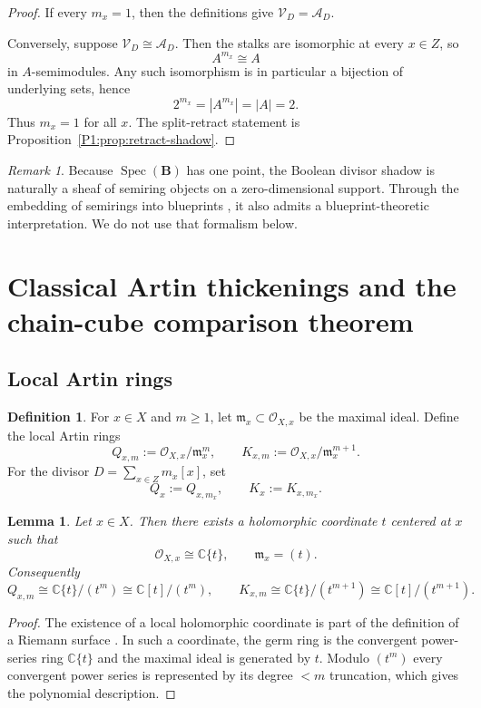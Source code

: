 \documentclass[11pt,a4paper]{article}
\numberwithin{equation}{section}
\newtheorem{lemma}[theorem]{Lemma}
\theoremstyle{definition}
\newtheorem{definition}[theorem]{Definition}
\theoremstyle{remark}
\newtheorem{remark}[theorem]{Remark}
\DeclareMathOperator{\Spec}{Spec}
\newcommand{\CC}{\mathbb C}
\newcommand{\BB}{\mathbf B}
\newcommand{\cO}{\mathcal O}
\newcommand{\cV}{\mathcal V}
\newcommand{\cA}{\mathcal A}
\begin{document}
\begin{proof}
If every $m_x=1$, then the definitions give $\cV_D=\cA_D$.

Conversely, suppose $\cV_D\cong\cA_D$.  Then the stalks are isomorphic at every $x\in Z$, so
\[
A^{m_x}\cong A
\]
in $A$-semimodules.  Any such isomorphism is in particular a bijection of underlying sets, hence
\[
2^{m_x}=|A^{m_x}|=|A|=2.
\]
Thus $m_x=1$ for all $x$.  The split-retract statement is Proposition~\ref{P1:prop:retract-shadow}.
\end{proof}

\begin{remark}
Because $\Spec(\BB)$ has one point, the Boolean divisor shadow is naturally a sheaf of semiring objects on a zero-dimensional support.  Through the embedding of semirings into blueprints \cite{Lorscheid}, it also admits a blueprint-theoretic interpretation.  We do not use that formalism below.
\end{remark}

\section{Classical Artin thickenings and the chain-cube comparison theorem}

\subsection{Local Artin rings}

\begin{definition}
For $x\in X$ and $m\ge1$, let $\mathfrak m_x\subset\cO_{X,x}$ be the maximal ideal.  Define the local Artin rings
\[
Q_{x,m}:=\cO_{X,x}/\mathfrak m_x^m,
\qquad
K_{x,m}:=\cO_{X,x}/\mathfrak m_x^{m+1}.
\]
For the divisor $D=\sum_{x\in Z}m_x[x]$, set
\[
Q_x:=Q_{x,m_x},\qquad K_x:=K_{x,m_x}.
\]
\end{definition}

\begin{lemma}\label{P1:lem:dvr-local}
Let $x\in X$.  Then there exists a holomorphic coordinate $t$ centered at $x$ such that
\[
\cO_{X,x}\cong\CC\{t\},\qquad \mathfrak m_x=(t).
\]
Consequently
\[
Q_{x,m}\cong\CC\{t\}/(t^m)\cong\CC[t]/(t^m),
\qquad
K_{x,m}\cong\CC\{t\}/(t^{m+1})\cong\CC[t]/(t^{m+1}).
\]
\end{lemma}

\begin{proof}
The existence of a local holomorphic coordinate is part of the definition of a Riemann surface \cite[Chapter~1]{Lee}.  In such a coordinate, the germ ring is the convergent power-series ring $\CC\{t\}$ and the maximal ideal is generated by $t$.  Modulo $(t^m)$ every convergent power series is represented by its degree $<m$ truncation, which gives the polynomial description.
\end{proof}
\end{document}
